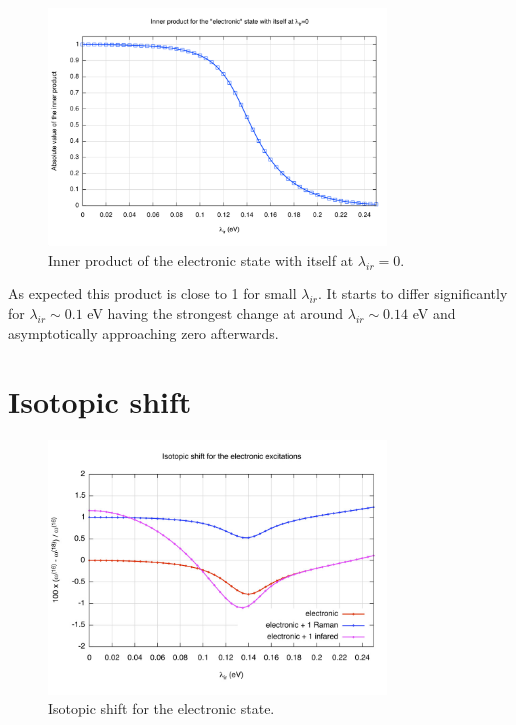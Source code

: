 \begin{figure}[ht!]
\centering
\includegraphics[width=0.8\textwidth]{images/electonic-state-inner-product.png}
\caption{Inner product of the electronic state with itself at $\lambda_{ir}=0$.}
\label{fig:electonic-state-inner-product}
\end{figure}

As expected this product is close to 1 for small $\lambda_{ir}$. It starts to differ significantly for $\lambda_{ir}\sim0.1$ eV having the strongest change at around $\lambda_{ir}\sim0.14$ eV and asymptotically approaching zero afterwards.

\section{Isotopic shift}

\begin{figure}[ht!]
\centering
\includegraphics[width=0.8\textwidth]{images/isot-el.jpg}
\caption{Isotopic shift for the electronic state.}
\label{fig:isot-el}
\end{figure}

